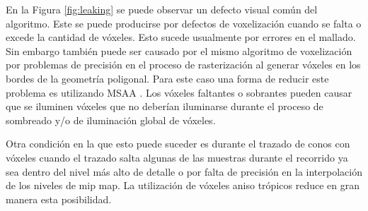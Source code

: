 En la Figura \ref{fig:leaking} se puede observar un defecto visual común del algoritmo. Este se puede producirse por defectos de voxelización cuando se falta o excede la cantidad de vóxeles. Esto sucede usualmente por errores en el mallado. Sin embargo también puede ser causado por el mismo algoritmo de voxelización por problemas de precisión en el proceso de rasterización al generar vóxeles en los bordes de la geometría poligonal. Para este caso una forma de reducir este problema es utilizando \ac{MSAA} \cite{gpuvoxelization}. Los vóxeles faltantes o sobrantes pueden causar que se iluminen vóxeles que no deberían iluminarse durante el proceso de sombreado y/o de iluminación global de vóxeles.

Otra condición en la que esto puede suceder es durante el trazado de conos con vóxeles cuando el trazado salta algunas de las muestras durante el recorrido ya sea dentro del nivel más alto de detalle o por falta de precisión en la interpolación de los niveles de mip map. La utilización de vóxeles aniso trópicos reduce en gran manera esta posibilidad.

